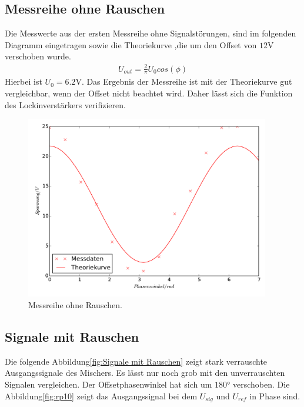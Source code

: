 \subsection{Messreihe ohne Rauschen}
\label{sec:Messreihe ohne Rauschen}
Die Messwerte aus der ersten Messreihe ohne Signalstörungen, sind im folgenden
Diagramm eingetragen sowie die Theoriekurve ,die um den Offset von $12\si{\volt}$
verschoben wurde.
\begin{align*}
U_{out}=\frac{2}{\pi}U_0cos(\phi)
\end{align*}
 Hierbei ist $U_0=6.2\si{\volt}$. Das Ergebnis der Messreihe ist
mit der Theoriekurve gut vergleichbar, wenn der Offset nicht beachtet wird.
Daher lässt sich die Funktion des Lockinverstärkers verifizieren.
\begin{figure}
  \centering
  \includegraphics[height=8cm]{or_signal.pdf}
  \caption{Messreihe ohne Rauschen.}
  \label{fig:Mor}
\end{figure}

\subsection{Signale mit Rauschen}
\label{sec:Signale mit Rauschen}
Die folgende Abbildung\eqref{fig:Signale mit Rauschen} zeigt stark verrauschte
Ausgangssignale des Mischers. Es lässt nur noch grob mit den unverrauschten
Signalen vergleichen. Der Offsetphasenwinkel hat sich um $180°$ verschoben. Die
Abbildung\eqref{fig:rp10} zeigt das Ausgangssignal bei dem $U_{sig}$ und
$U_{ref}$ in Phase sind.

